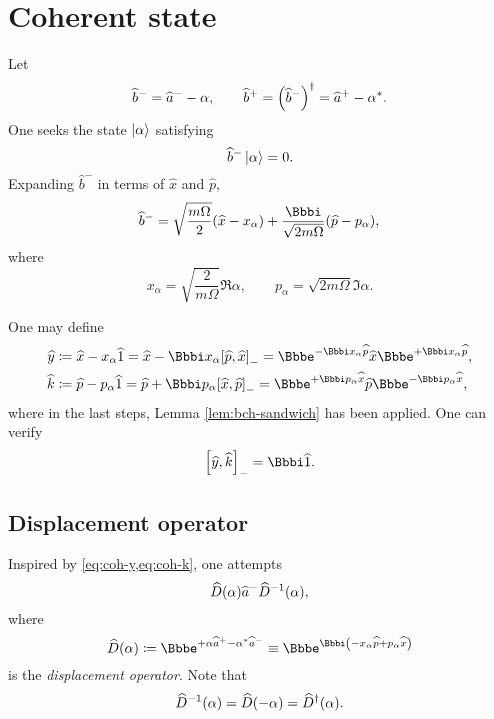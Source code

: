 \section{Coherent state}

Let
\begin{equation}
\widehat{b}^- = \widehat{a}^- - \alpha,\qquad
\widehat{b}^+ = {\left(\widehat{b}^-\right)}^\dagger = \widehat{a}^+ - \alpha^*.
\label{eq:displacement-b}
\end{equation}
One seeks the state $\Ket{\alpha}$ satisfying
\begin{equation}
\widehat{b}^-\Ket{\alpha} = 0.
\label{eq:coherent-state-def-1}
\end{equation}
Expanding $\widehat{b}^-$ in terms of $\widehat{x}$ and $\widehat{p}$,
\begin{equation}
\widehat{b}^- = \sqrt{\frac{m\Omega}{2}}\rbr{\widehat{x}-x_\alpha}
+ \frac{\ii}{\sqrt{2m\Omega}}\rbr{\widehat{p}-p_\alpha},
\end{equation}
where
\begin{equation}
x_\alpha = \sqrt{\frac{2}{m\Omega}}\Re\alpha,\qquad
p_\alpha = \sqrt{2m\Omega}\Im\alpha.
\end{equation}

One may define
\begin{align}
\widehat{y} & \coloneqq \widehat{x} - x_\alpha \widehat{1}
= \widehat{x} - \ii x_\alpha\sbr{\widehat{p},\widehat{x}}_-
= \ee^{-\ii x_\alpha \widehat{p}} \widehat{x} \ee^{+\ii x_\alpha \widehat{p}},
\label{eq:coh-y}\\
\widehat{k} & \coloneqq \widehat{p} - p_\alpha \widehat{1}
= \widehat{p} + \ii p_\alpha\sbr{\widehat{x},\widehat{p}}_-
= \ee^{+\ii p_\alpha \widehat{x}} \widehat{p} \ee^{-\ii p_\alpha \widehat{x}},
\label{eq:coh-k}
\end{align}
where in the last steps, Lemma \ref{lem:bch-sandwich} has been applied.
One can verify
\begin{equation}
\sbr{\widehat{y}, \widehat{k}}_- = \ii \widehat{1}.
\end{equation}

\subsection{Displacement operator}
Inspired by \cref{eq:coh-y,eq:coh-k}, one attempts
\begin{equation}
{\widehat{D}}\mathopen{}\left(\alpha\right)\mathclose{}\widehat{a}^-{\widehat{D}^{-1}}\mathopen{}\left(\alpha\right)\mathclose{},
\end{equation}
where
\begin{equation}
\rfun{\widehat{D}}{\alpha} \coloneqq
\ee^{+\alpha\widehat{a}^+ - \alpha^*\widehat{a}^-}
\equiv \ee^{\ii\rbr{-x_\alpha\widehat{p}+p_\alpha\widehat{x}}}
\end{equation}
is the \emph{displacement operator}. Note that
\begin{equation}
{\widehat{D}^{-1}}\mathopen{}\left(\alpha\right)\mathclose{} = {\widehat{D}}\mathopen{}\left(-\alpha\right)\mathclose{}
= {\widehat{D}^\dagger}\mathopen{}\left(\alpha\right)\mathclose{}.
\end{equation}

